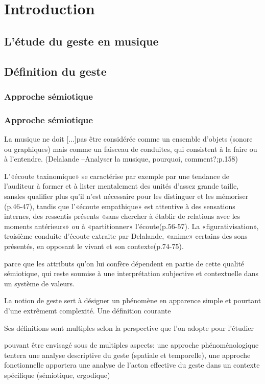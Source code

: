 
\section{Introduction}
	\subsection{L'étude du geste en musique}
	\subsection{Définition du geste}
		\subsubsection{Approche sémiotique}
		\subsubsection{Approche sémiotique}






La musique ne doit [...]pas être considérée comme un ensemble d’objets (sonore ou graphiques) mais comme un faisceau de conduites, qui consistent à la faire ou à l’entendre. (Delalande –Analyser la musique, pourquoi, comment?;p.158) 
 
L’«écoute taxinomique» se caractérise par exemple par une tendance de l’auditeur à former et à lister mentalement des unités d’assez grande taille, sansles qualifier plus qu’il n’est nécessaire pour les distinguer et les mémoriser (p.46-47), tandis que l’«écoute empathique» est attentive à des sensations internes, des ressentis présents «sans chercher à  établir de relations avec les moments antérieurs» ou à «partitionner» l’écoute(p.56-57). La «figurativisation», troisième conduite d’écoute extraite par Delalande, «anime» certains des sons présentés, en opposant le vivant et son contexte(p.74-75).

parce que les attributs qu'on lui confère dépendent en partie de cette qualité sémiotique, qui reste soumise à une interprétation subjective et contextuelle dans un système de valeurs.

La notion de geste sert à désigner un phénomène en apparence simple et pourtant d'une extrêmemt complexité. Une définition courante 

Ses définitions sont multiples selon la perspective que l'on adopte pour l'étudier

pouvant être envisagé sous de multiples aspects: une approche phénoménologique tentera une analyse descriptive du geste (spatiale et temporelle), une approche fonctionnelle apportera une analyse de l'acton effective du geste dans un contexte spécifique (sémiotique, ergodique)

